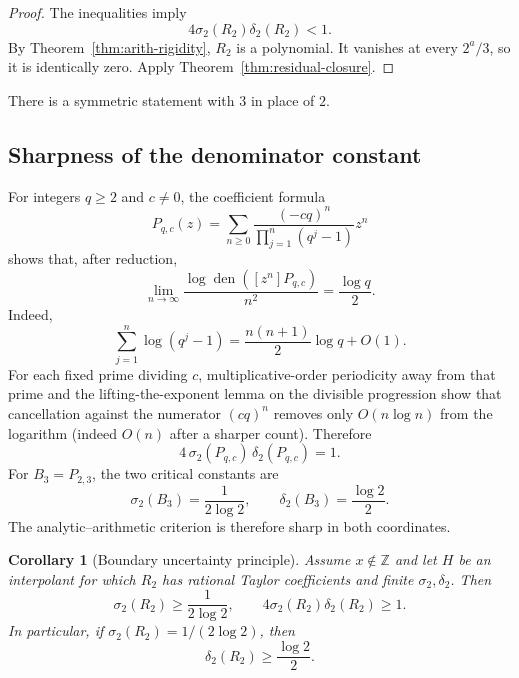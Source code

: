 \documentclass[11pt]{article}
\newtheorem{corollary}[theorem]{Corollary}
\theoremstyle{definition}
\newcommand{\Z}{\mathbb Z}
\newcommand{\den}{\operatorname{den}}
\begin{document}
\begin{proof}
The inequalities imply
\[
  4\sigma_2(R_2)\delta_2(R_2)<1.
\]
By Theorem~\ref{thm:arith-rigidity}, \(R_2\) is a polynomial.  It vanishes at every \(2^a/3\), so it is identically zero.  Apply Theorem~\ref{thm:residual-closure}.
\end{proof}

There is a symmetric statement with \(3\) in place of \(2\).

\subsection{Sharpness of the denominator constant}

For integers \(q\ge2\) and \(c\ne0\), the coefficient formula
\begin{equation}\label{eq:general-edge-coeff}
  P_{q,c}(z)
  =\sum_{n\ge0}
   \frac{(-cq)^n}{\prod_{j=1}^n(q^j-1)}z^n
\end{equation}
shows that, after reduction,
\begin{equation}\label{eq:edge-den-limit}
  \lim_{n\to\infty}
  \frac{\log\den([z^n]P_{q,c})}{n^2}
  =\frac{\log q}{2}.
\end{equation}
Indeed,
\[
  \sum_{j=1}^n\log(q^j-1)
  =\frac{n(n+1)}2\log q+O(1).
\]
For each fixed prime dividing \(c\), multiplicative-order periodicity away from that prime and the lifting-the-exponent lemma on the divisible progression show that cancellation against the numerator \((cq)^n\) removes only \(O(n\log n)\) from the logarithm (indeed \(O(n)\) after a sharper count).  Therefore
\begin{equation}\label{eq:edge-uncertainty-equality}
  4\,\sigma_2(P_{q,c})\,\delta_2(P_{q,c})=1.
\end{equation}
For \(B_3=P_{2,3}\), the two critical constants are
\[
  \sigma_2(B_3)=\frac1{2\log2},
  \qquad
  \delta_2(B_3)=\frac{\log2}{2}.
\]
The analytic--arithmetic criterion is therefore sharp in both coordinates.

\begin{corollary}[Boundary uncertainty principle]\label{cor:uncertainty}
Assume \(x\notin\Z\) and let \(H\) be an interpolant for which \(R_2\) has rational Taylor coefficients and finite \(\sigma_2,\delta_2\).  Then
\begin{equation}\label{eq:boundary-uncertainty}
  \sigma_2(R_2)\ge\frac1{2\log2},
  \qquad
  4\sigma_2(R_2)\delta_2(R_2)\ge1.
\end{equation}
In particular, if \(\sigma_2(R_2)=1/(2\log2)\), then
\[
  \delta_2(R_2)\ge\frac{\log2}{2}.
\]
\end{corollary}
\end{document}
